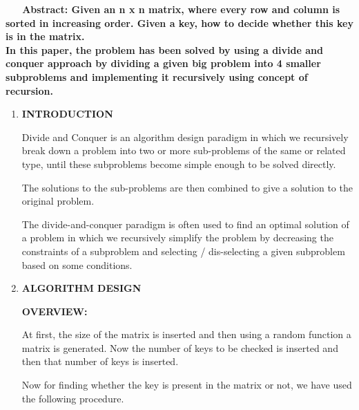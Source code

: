 \documentclass[14pt]{article}
\renewcommand{\_}{\kern-1.5pt\textunderscore\kern-1.5pt}
\begin{document}
\vspace{\baselineskip}
\begin{multicols}{2}
\begin{justify}
\textbf{\ \ \  Abstract: Given an n x n matrix, where every row and column is sorted in increasing order. Given a key, how to decide whether this key is in the matrix. \\
In this paper, the problem has been solved by using a divide and conquer approach by dividing a given big problem into 4 smaller subproblems and implementing it recursively using concept of recursion.}
\end{justify}

\vspace{\baselineskip}

\vspace{\baselineskip}
\begin{enumerate}
	\item {\fontsize{15pt}{18.0pt}\selectfont \textbf{INTRODUCTION}}

\vspace{\baselineskip}
\begin{justify}
Divide and Conquer is an algorithm design paradigm in which we recursively break down a problem into two or more sub-problems of the same or related type, until these subproblems become simple enough to be solved directly.
\end{justify}
\begin{justify}
The solutions to the sub-problems are then combined to give a solution to the original problem.
\end{justify}
\begin{justify}
The divide-and-conquer paradigm is often used to find an optimal solution of a problem in which we recursively simplify the problem by decreasing the constraints of a subproblem and selecting / dis-selecting a given subproblem based on some conditions.
\end{justify}

\vspace{\baselineskip}

\vspace{\baselineskip}

\vspace{\baselineskip}
	\item {\fontsize{15pt}{18.0pt}\selectfont \textbf{ALGORITHM DESIGN}}

\vspace{\baselineskip}
\begin{justify}
{\fontsize{12pt}{14.4pt}\selectfont \textbf{OVERVIEW:}}
\end{justify}
\begin{justify}
At first, the size of the matrix is inserted and then using a random function a matrix is generated. Now the number of keys to be checked is inserted and then that number of keys is inserted.
\end{justify}
\begin{justify}
Now for finding whether the key is present in the matrix or not, we have used the following procedure.
\end{justify}


\end{enumerate}
\end{multicols}
\end{document}
